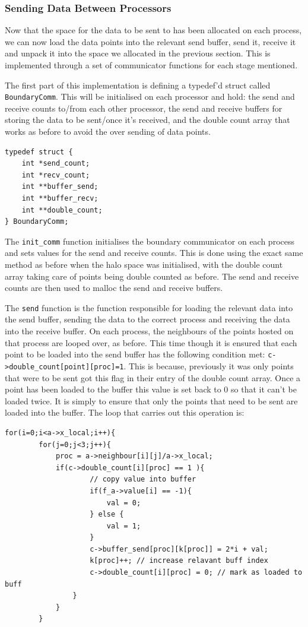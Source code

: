 \documentclass[pdftex,12pt,a4paper]{article}
\begin{document}
\subsubsection{Sending Data Between Processors}

Now that the space for the data to be sent to has been allocated on each process, we can now load the data points into the relevant send buffer, send it, receive it and unpack it into the space we allocated in the previous section. This is implemented through a set of communicator functions for each stage mentioned.

The first part of this implementation is defining a typedef'd struct called \verb|BoundaryComm|. This will be initialised on each processor and hold:  the send and receive counts to/from each other processor, the send and receive buffers for storing the data to be sent/once it's received, and the double count array that works as before to avoid the over sending of data points. 

\begin{lstlisting}
typedef struct {
	int *send_count;
	int *recv_count;
	int **buffer_send;
	int **buffer_recv;
	int **double_count;
} BoundaryComm; 
\end{lstlisting}

The \verb|init_comm| function initialises the boundary communicator on each process and sets values for the send and receive counts. This is done using the exact same method as before when the halo space was initialised, with the double count array taking care of points being double counted as before. The send and receive counts are then used to malloc the send and receive buffers.

The \verb|send| function is the function responsible for loading the relevant data into the send buffer, sending the data to the correct process and receiving the data into the receive buffer. On each process, the neighbours of the points hosted on that process are looped over, as before. This time though it is ensured that each point to be loaded into the send buffer has the following condition met: \verb|c->double_count[point][proc]=1|. This is because, previously it was only points that were to be sent got this flag in their entry of the double count array. Once a point has been loaded to the buffer this value is set back to 0 so that it can't be loaded twice. It is simply to ensure that only the points that need to be sent are loaded into the buffer. The loop that carries out this operation is:
\newpage
\begin{lstlisting}
for(i=0;i<a->x_local;i++){
		for(j=0;j<3;j++){
			proc = a->neighbour[i][j]/a->x_local;
			if(c->double_count[i][proc] == 1 ){
					// copy value into buffer
					if(f_a->value[i] == -1){
						val = 0;
					} else {
						val = 1;
					}
					c->buffer_send[proc][k[proc]] = 2*i + val;
					k[proc]++; // increase relavant buff index
					c->double_count[i][proc] = 0; // mark as loaded to buff
				}
			}
		}
\end{lstlisting} 
\end{document}
